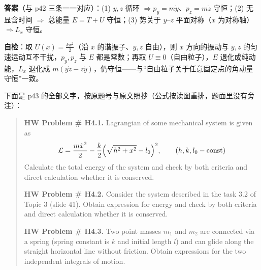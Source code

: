 \documentclass[11pt]{ctexart}
\begin{document}

\textbf{答案}（与 p42 三条一一对应）：(1) $y,z$ 循环 $\Rightarrow p_y=m\dot y$、$p_z=m\dot z$ 守恒；(2) 无显含时间 $\Rightarrow$ 总能量 $E=T+U$ 守恒；(3) 势关于 $y$--$z$ 平面对称（$x$ 为对称轴）$\Rightarrow L_x$ 守恒。

\textbf{自检}：取 $U(x)=\frac{kx^2}{2}$（沿 $x$ 的谐振子、$y,z$ 自由），则 $x$ 方向的振动与 $y,z$ 的匀速运动互不干扰，$p_y,p_z$ 与 $E$ 都是常数；再取 $U\equiv0$（自由粒子），$E$ 退化成纯动能，$L_x$ 退化成 $m(y\dot z-z\dot y)$，仍守恒——与“自由粒子关于任意固定点的角动量守恒”一致。


下面是 p43 的全部文字，按原题号与原文照抄（公式按读图重排，题面里没有旁注）：

\begin{quote}
\textbf{HW Problem \# H4.1.} Lagrangian of some mechanical system is given as
\[
\mathcal{L}=\frac{m\dot x^2}{2}-\frac{k}{2}\Bigl(\sqrt{h^2+x^2}-l_0\Bigr)^2,\qquad (h,k,l_0-\text{const})
\]
Calculate the total energy of the system and check by both criteria and direct calculation whether it is conserved.

\medskip
\textbf{HW Problem \# H4.2.} Consider the system described in the task 3.2 of Topic 3 (slide 41). Obtain expression for energy and check by both criteria and direct calculation whether it is conserved.

\medskip
\textbf{HW Problem \# H4.3.} Two point masses $m_1$ and $m_2$ are connected via a spring (spring constant is $k$ and initial length $l$) and can glide along the straight horizontal line without friction. Obtain expressions for the two independent integrals of motion.
\end{quote}

\end{document}
